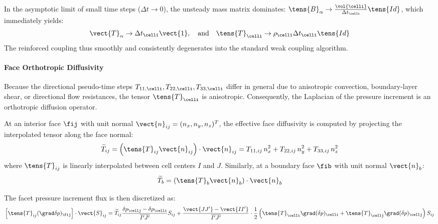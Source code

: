In the asymptotic limit of small time steps ($\Delta t \to 0$), the unsteady mass
matrix dominates: $\tens{B}_\alpha \to \frac{\vol{\celli}}{\Delta t_\celli} \tens{Id}$,
which immediately yields:
\begin{equation}
  \vect{T}_\alpha \to \Delta t_\celli \vect{1}, \quad \text{and} \quad \tens{T}_\celli \to \rho_\celli \Delta t_\celli \tens{Id}
\end{equation}
The reinforced coupling thus smoothly and consistently degenerates into the standard
weak coupling algorithm.

\paragraph{Face Orthotropic Diffusivity}
Because the directional pseudo-time steps $T_{11,\celli}, T_{22,\celli}, T_{33,\celli}$
differ in general due to anisotropic convection, boundary-layer shear, or directional
flow resistances, the tensor $\tens{T}_\celli$ is anisotropic. Consequently, the
Laplacian of the pressure increment is an orthotropic diffusion operator.

At an interior face $\fij$ with unit normal $\vect{n}_{ij} = (n_x, n_y, n_z)^T$,
the effective face diffusivity is computed by projecting the interpolated tensor
along the face normal:
\begin{equation}
  \widetilde{T}_{ij} = \left( \tens{T}_{ij} \vect{n}_{ij} \right) \cdot \vect{n}_{ij}
  = T_{11,ij} \, n_x^2 + T_{22,ij} \, n_y^2 + T_{33,ij} \, n_z^2
  \label{eq:reinforced_coupling:face_diffusivity}
\end{equation}
where $\tens{T}_{ij}$ is linearly interpolated between cell centers $I$ and $J$.
Similarly, at a boundary face $\fib$ with unit normal $\vect{n}_b$:
\begin{equation}
  \widetilde{T}_{b} = \left( \tens{T}_{b} \vect{n}_{b} \right) \cdot \vect{n}_{b}
\end{equation}

The facet pressure increment flux is then discretized as:
\begin{equation}
  \left[ \tens{T}_{ij} (\grad \delta p)_{\fij} \right] \cdot \vect{S}_{ij}
  = \widetilde{T}_{ij} \frac{\delta p_\cellj - \delta p_\celli}{\overline{I'J'}} S_{ij}
  + \frac{\vect{JJ'} - \vect{II'}}{\overline{I'J'}} \cdot \frac{1}{2}
  \left( \tens{T}_\celli \grad(\delta p)_\celli + \tens{T}_\cellj \grad(\delta p)_\cellj \right) S_{ij}
\end{equation}

